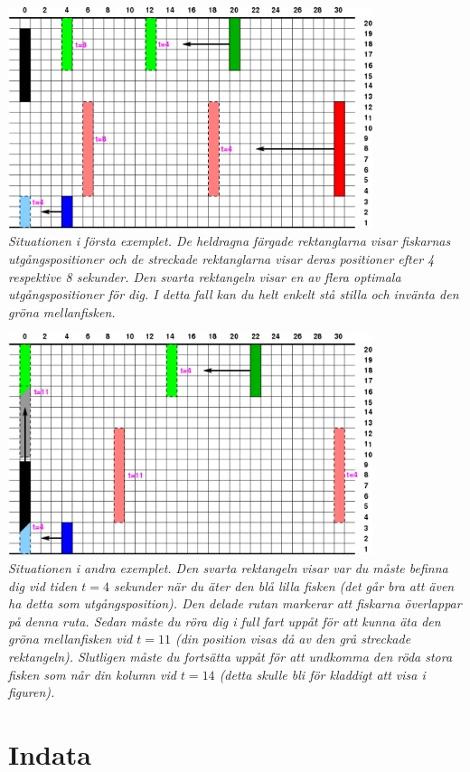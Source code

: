 \includegraphics[width=0.8\textwidth]{fiskspelet.png}\\
\emph{Situationen i första exemplet. De heldragna färgade rektanglarna
visar fiskarnas utgångspositioner och de streckade rektanglarna visar
deras positioner efter 4 respektive 8 sekunder. Den svarta rektangeln
visar en av flera optimala utgångspositioner för dig. I detta fall kan
du helt enkelt stå stilla och invänta den gröna mellanfisken.}

\includegraphics[width=0.8\textwidth]{fiskspelet2.png}\\
\emph{Situationen i andra exemplet. Den svarta rektangeln visar var
du måste befinna dig vid tiden $t=4$ sekunder när du äter den blå
lilla fisken (det går bra att även ha detta som utgångsposition). Den
delade rutan markerar att fiskarna överlappar på denna ruta. Sedan
måste du röra dig i full fart uppåt för att kunna äta den gröna
mellanfisken vid $t=11$ (din position visas då av den grå streckade
rektangeln). Slutligen måste du fortsätta uppåt för att undkomma den
röda stora fisken som når din kolumn vid $t=14$ (detta skulle bli för
kladdigt att visa i figuren).}



\section*{Indata}

